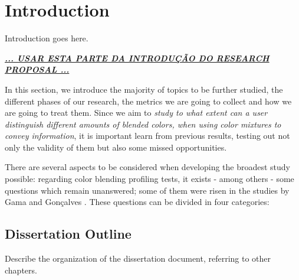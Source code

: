 
\chapter{Introduction}
\label{chapter:introduction}
Introduction goes here. \par
%
\textbf{\underline{\emph{... USAR ESTA PARTE DA INTRODUÇÃO DO RESEARCH PROPOSAL ...}}} \par
%
In this section, we introduce the majority of topics to be further studied, the different phases of our research, the metrics we are going to collect and how we are going to treat them. Since we aim to \emph{study to what extent can a user distinguish different amounts of blended colors, when using color mixtures to convey information}, it is important learn from previous results, testing out not only the validity of them but also some missed opportunities. \par
There are several aspects to be considered when developing the broadest study possible: regarding color blending profiling tests, it exists - among
others - some questions which remain unanswered; some of them were risen in the studies by Gama and Gonçalves \cite{Gama20141,Gama20142}. These questions can be divided in four categories:
%
\section{Dissertation Outline}
Describe the organization of the dissertation document, referring to other chapters.
